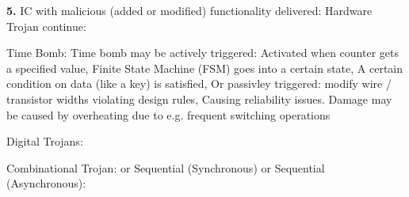 \documentclass[landscape, a4paper]{article}
\begin{document}
\begin{minipage}[t]{0.2\linewidth}
	\begin{betterlist}
  \item[\bfseries\alert{5.}] \alert{IC with malicious (added or modified) functionality delivered:} \alert{Hardware Trojan continue:}
		\begin{betterlist}
			\item \alert{Time Bomb:} Time bomb may be \alert{actively triggered:} Activated when counter gets a specified value, Finite State Machine (FSM) goes into a certain state, A certain condition on data (like a key) is satisfied, \alert{Or passivley triggered:} modify wire / transistor widths violating design rules, Causing reliability issues. Damage may be caused by overheating due to e.g. frequent switching operations
			\item \alert{Digital Trojans:}
			\begin{betterlist}
				\item \alert{Combinational Trojan:} or \alert{Sequential (Synchronous) or Sequential (Asynchronous):}


\end{betterlist}
\end{betterlist}
\end{betterlist}
\end{minipage}
\end{document}
